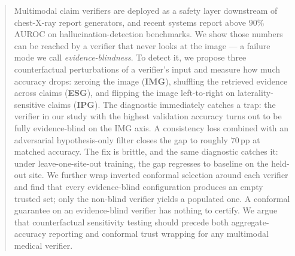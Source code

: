 \documentclass{article}
\begin{document}

\printAffiliationsAndNotice{}

\begin{abstract}
Multimodal claim verifiers are deployed as a safety layer downstream of
chest-X-ray report generators, and recent systems report above $90\%$
AUROC on hallucination-detection benchmarks. We show those numbers can
be reached by a verifier that never looks at the image --- a failure
mode we call \emph{evidence-blindness}. To detect it, we propose three
counterfactual perturbations of a verifier's input and measure how much
accuracy drops: zeroing the image (\textbf{IMG}), shuffling the
retrieved evidence across claims (\textbf{ESG}), and flipping the image
left-to-right on laterality-sensitive claims (\textbf{IPG}). The
diagnostic immediately catches a trap: the verifier in our study with
the highest validation accuracy turns out to be fully evidence-blind on
the IMG axis. A consistency loss combined with an adversarial
hypothesis-only filter closes the gap to roughly $70$\,pp at matched
accuracy. The fix is brittle, and the same diagnostic catches it: under
leave-one-site-out training, the gap regresses to baseline on the
held-out site. We further wrap inverted conformal selection around each
verifier and find that every evidence-blind configuration produces an
empty trusted set; only the non-blind verifier yields a populated one.
A conformal guarantee on an evidence-blind verifier has nothing to
certify. We argue that counterfactual sensitivity testing should
precede both aggregate-accuracy reporting and conformal trust wrapping
for any multimodal medical verifier.
\end{abstract}
\end{document}
